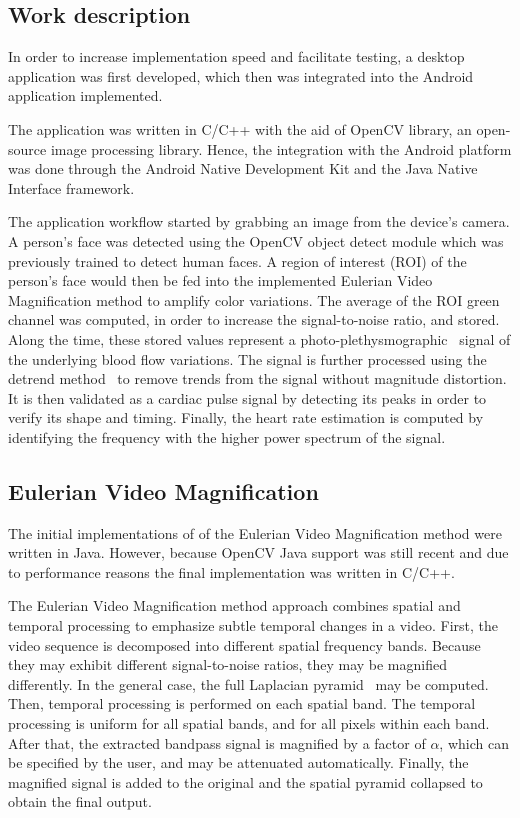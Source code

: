 \documentclass[9pt,a4paper]{extarticle}
\newcommand{\evm}{Eulerian Video Magnification}
\begin{document}
\begin{multicols}{2}
\section{Work description}\label{sec:work}

In order to increase implementation speed and facilitate testing, a
desktop application was first developed, which then was integrated into
the Android application implemented.

The application was written in C/C++ with the aid of OpenCV library, an
open-source image processing library. Hence, the integration with the Android
platform was done through the Android Native Development Kit and the
Java Native Interface framework.

The application workflow started by grabbing an image from the device's
camera. A person's face was detected using the OpenCV object detect module
which was previously trained to detect human faces. A region of interest (ROI)
of the person's face would then be fed into the implemented \evm{} method to
amplify color variations. The average of the ROI green channel was computed,
in order to increase the signal-to-noise ratio, and stored. Along the time,
these stored values represent a
photo-plethysmographic~\cite{Verkruysse2008Remote} signal of the underlying
blood flow variations. The signal is further processed using the detrend
method~\cite{Tarvainen2002Advanced}
to remove trends from the signal without magnitude distortion. It is then
validated as a cardiac pulse signal by detecting its peaks in order to
verify its shape and timing. Finally, the heart rate estimation is
computed by identifying the frequency with the higher power spectrum of
the signal.

\subsection{Eulerian Video Magnification}\label{sec:work:evm}

The initial implementations of of the \evm{} method were written in Java.
However, because OpenCV Java support was still recent and due to performance
reasons the final implementation was written in C/C++.

The \evm{} method approach combines
spatial and temporal processing to emphasize subtle temporal changes
in a video. First, the video sequence is decomposed into different
spatial frequency bands. Because they may exhibit different
signal-to-noise ratios, they may be magnified differently.
In the general case, the full Laplacian pyramid~\cite{Burt1983Laplacian}
may be computed. Then, temporal processing is performed on each
spatial band. The temporal processing is uniform for all spatial
bands, and for all pixels within each band. After that, the extracted
bandpass signal is magnified by a factor of $\alpha$, which can be
specified by the user, and may be attenuated automatically. Finally,
the magnified signal is added to the original and the spatial pyramid
collapsed to obtain the final output.


\end{multicols}
\end{document}
